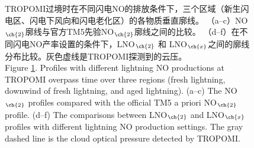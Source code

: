 \begin{landscape}
\vspace*{\fill}
\begin{figure}[H]
    \centering
    \caption{
    TROPOMI过境时在不同闪电NO的排放条件下，三个区域（新生闪电区、闪电下风向和闪电老化区）的各物质垂直廓线。
    （a--c）NO$_{\ch{2}}$廓线与官方TM5先验NO$_{\ch{2}}$廓线之间的比较。
    （d--f）在不同闪电NO产率设置的条件下，LNO$_{\ch{2}}$ 和 LNO$_{\ch{x}}$之间的廓线分布比较。灰色虚线是TROPOMI探测到的云压。\\
     Figure \ref{fig:china_nox_profile}. Profiles with different lightning NO productions at TROPOMI overpass time over three regions (fresh lightning, downwind of fresh lightning, and aged lightning).
    (a--c) The NO$_{\ch{2}}$ profiles compared with the official TM5 a priori NO$_{\ch{2}}$ profile.
    (d--f) The comparisons between LNO$_{\ch{2}}$ and LNO$_{\ch{x}}$ profiles with different lightning NO production settings.
    The gray dashed line is the cloud optical pressure detected by TROPOMI.
    }
    \label{fig:china_nox_profile}
\end{figure}
\vspace*{\fill}
\end{landscape}


